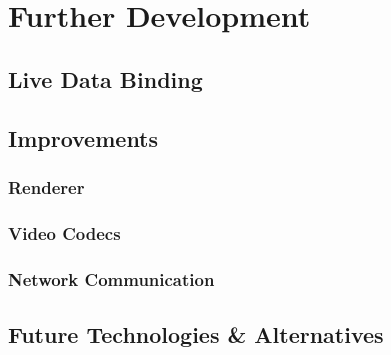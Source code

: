 \chapter{Further Development}

\section{Live Data Binding}

\section{Improvements}
\subsection{Renderer}
\subsection{Video Codecs}
\subsection{Network Communication}

\section{Future Technologies \& Alternatives}